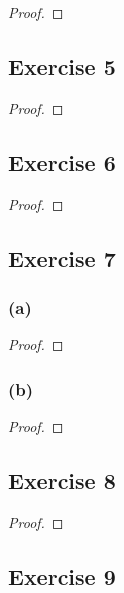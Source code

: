\documentclass[14pt]{extarticle}
\begin{document}
\begin{proof}

\end{proof}

\subsection{Exercise 5}

\begin{proof}

\end{proof}

\subsection{Exercise 6}

\begin{proof}

\end{proof}

\subsection{Exercise 7}

\subsubsection{(a)}

\begin{proof}

\end{proof}

\subsubsection{(b)}

\begin{proof}

\end{proof}

\subsection{Exercise 8}

\begin{proof}

\end{proof}

\subsection{Exercise 9}
\end{document}
